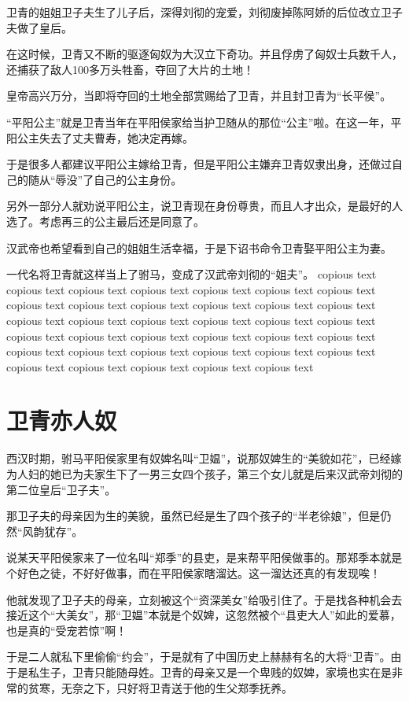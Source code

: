 \documentclass[UTF8,cap,nofonts,openany,twoside]{ctexbook}
\begin{document}
卫青的姐姐卫子夫生了儿子后，深得刘彻的宠爱，刘彻废掉陈阿娇的后位改立卫子夫做了皇后。

在这时候，卫青又不断的驱逐匈奴为大汉立下奇功。并且俘虏了匈奴士兵数千人，还捕获了敌人100多万头牲畜，夺回了大片的土地！

皇帝高兴万分，当即将夺回的土地全部赏赐给了卫青，并且封卫青为“长平侯”。

“平阳公主”就是卫青当年在平阳侯家给当护卫随从的那位“公主”啦。在这一年，平阳公主失去了丈夫曹寿，她决定再嫁。

于是很多人都建议平阳公主嫁给卫青，但是平阳公主嫌弃卫青奴隶出身，还做过自己的随从“辱没”了自己的公主身份。

另外一部分人就劝说平阳公主，说卫青现在身份尊贵，而且人才出众，是最好的人选了。考虑再三的公主最后还是同意了。

汉武帝也希望看到自己的姐姐生活幸福，于是下诏书命令卫青娶平阳公主为妻。

一代名将卫青就这样当上了驸马，变成了汉武帝刘彻的“姐夫”。
\setcounter{page}{100}
\noindent copious text copious text copious text copious text copious text copious text copious text copious text copious text copious text copious text copious text copious text copious text copious text copious text copious text copious text copious text copious text copious text copious text copious text copious text copious text copious text copious text copious text copious text copious text copious text copious text copious text copious text copious text copious text

\chapter{卫青亦人奴}

西汉时期，驸马平阳侯家里有奴婢名叫“卫媪”，说那奴婢生的“美貌如花”，已经嫁为人妇的她已为夫家生下了一男三女四个孩子，第三个女儿就是后来汉武帝刘彻的第二位皇后“卫子夫”。

那卫子夫的母亲因为生的美貌，虽然已经是生了四个孩子的“半老徐娘”，但是仍然“风韵犹存”。

说某天平阳侯家来了一位名叫“郑季”的县吏，是来帮平阳侯做事的。那郑季本就是个好色之徒，不好好做事，而在平阳侯家瞎溜达。这一溜达还真的有发现唉！

他就发现了卫子夫的母亲，立刻被这个“资深美女”给吸引住了。于是找各种机会去接近这个“大美女”，那“卫媪”本就是个奴婢，这忽然被个“县吏大人”如此的爱慕，也是真的“受宠若惊”啊！

于是二人就私下里偷偷“约会”，于是就有了中国历史上赫赫有名的大将“卫青”。由于是私生子，卫青只能随母姓。卫青的母亲又是一个卑贱的奴婢，家境也实在是非常的贫寒，无奈之下，只好将卫青送于他的生父郑季抚养。
\end{document}

